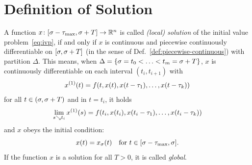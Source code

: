 


\section{Definition of Solution}
    \label{sec:definition-of-solution}

    \begin{definition}\label{def:solution-dde}
        A function $x\colon[\sigma-\tau_{\max},\sigma+T]\to\mathbb{R}^n$ is called \emph{(local) solution} of the initial value problem~\eqref{eq:ivp}, if and only if
        $x$ is continuous and piecewise continuously differentiable on $[\sigma,\sigma+T]$ (in the sense of Def.~\ref{def:piecewise-continuous}) with partition $\Delta$.
        This means, when $\Delta=\left\{\sigma=t_0<\ldots<t_m=\sigma+T\right\}$, $x$ is continuously differentiable on each interval $(t_i,t_{i+1})$
        with
        \begin{equation*}
            \D{x}(t) = f(t,x(t),x(t-\tau_1),\ldots,x(t-\tau_k))
        \end{equation*}
        for all $t\in (\sigma,\sigma+T)$ and in $t=t_i$, it holds
        \begin{equation*}
            \lim_{s\downto t_i}\D{x}(s) = f(t_i,x(t_i),x(t_i-\tau_1),\ldots,x(t_i-\tau_k))
        \end{equation*}
        and $x$ obeys the initial condition:
        \begin{equation*}
            x(t) = x_{\sigma}(t) \quad\text{for } t\in [\sigma-\tau_{\max},\sigma].
        \end{equation*}
        If the function $x$ is a solution for all $T>0$, it is called \emph{global}.

    \end{definition}

